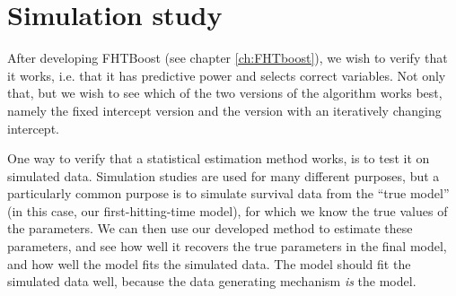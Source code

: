 \chapter{Simulation study}
After developing FHTBoost (see chapter \ref{ch:FHTboost}), we wish to verify that it works, i.e. that it has predictive power and selects correct variables.
Not only that, but we wish to see which of the two versions of the algorithm works best, namely the fixed intercept version and the version with an iteratively changing intercept.

One way to verify that a statistical estimation method works, is to test it on simulated data.
Simulation studies are used for many different purposes, but a particularly common purpose is to simulate survival data from the ``true model'' (in this case, our first-hitting-time model), for which we know the true values of the parameters.
We can then use our developed method to estimate these parameters, and see how well it recovers the true parameters in the final model, and how well the model fits the simulated data.
The model should fit the simulated data well, because the data generating mechanism \textit{is} the model.


